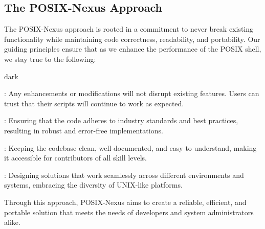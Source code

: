 \subsection{The POSIX-Nexus Approach}
\label{sec:introduction:sub:approach}
The POSIX-Nexus approach is rooted in a commitment to never break existing functionality while maintaining code correctness, readability, and portability. Our guiding principles ensure that as we enhance the performance of the POSIX shell, we stay true to the following:
\bigskip
\begin{baseBoxOne}{}{dark}
    \begin{posnexItemize} 
        \item[\sA] : Any enhancements or modifications will not disrupt existing features. Users can trust that their scripts will continue to work as expected.
        \item[\sA] : Ensuring that the code adheres to industry standards and best practices, resulting in robust and error-free implementations.
        \item[\sA] : Keeping the codebase clean, well-documented, and easy to understand, making it accessible for contributors of all skill levels.
        \item[\sA] : Designing solutions that work seamlessly across different environments and systems, embracing the diversity of UNIX-like platforms.
    \end{posnexItemize}
\end{baseBoxOne}
\bigskip
Through this approach, POSIX-Nexus aims to create a reliable, efficient, and portable solution that meets the needs of developers and system administrators alike.

